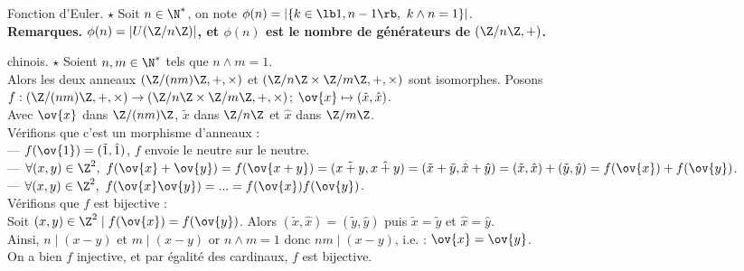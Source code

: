 \documentclass[11pt]{article}
\begin{document}
\begin{defi}{Fonction d'Euler. $\star$}{}
    Soit $n\in\N^*$, on note $\phi(n)=|\{k\in\lb1,n-1\rb, ~ k \land n = 1\}|$.\\
    \bf{Remarques.} $\phi(n)=|U(\Z/n\Z)|$, et $\phi(n)$ est le nombre de générateurs de $(\Z/n\Z,+)$.
\end{defi}

\begin{thm}{chinois. $\star$}{}
    Soient $n,m\in\N^*$ tels que $n\land m=1$.\\
    Alors les deux anneaux $(\Z/(nm)\Z,+,\times)$ et $(\Z/n\Z\times\Z/m\Z,+,\times)$ sont isomorphes.
    \tcblower
    Posons $f:(\Z/(nm)\Z,+,\times)\to(\Z/n\Z\times\Z/m\Z,+,\times)$; $\ov{x}\mapsto(\tilde{x},\hat{x})$.\\
    Avec $\ov{x}$ dans $\Z/(nm)\Z$, $\tilde{x}$ dans $\Z/n\Z$ et $\hat{x}$ dans $\Z/m\Z$.\\
    Vérifions que c'est un morphisme d'anneaux :\\
    --- $f(\ov{1})=(\tilde{1},\hat{1})$, $f$ envoie le neutre sur le neutre.\\
    --- $\forall (x,y) \in \Z^2, ~ f(\ov{x}+\ov{y})=f(\ov{x+y})=(\tilde{x+y},\hat{x+y})=(\tilde{x}+\tilde{y},\hat{x}+\hat{y})=(\tilde{x},\hat{x})+(\tilde{y},\hat{y})=f(\ov{x})+f(\ov{y})$.\\
    --- $\forall (x,y) \in \Z^2, ~ f(\ov{x}\ov{y})=...=f(\ov{x})f(\ov{y})$.\\
    Vérifions que $f$ est bijective :\\
    Soit $(x,y)\in\Z^2 \mid f(\ov{x})=f(\ov{y})$. Alors $(\tilde{x},\hat{x})=(\tilde{y},\hat{y})$ puis $\tilde{x}=\tilde{y}$ et $\hat{x}=\hat{y}$.\\
    Ainsi, $n \mid (x-y)$ et $m \mid (x-y)$ or $n\land m = 1$ donc $nm \mid (x-y)$, i.e. : $\ov{x}=\ov{y}$.\\
    On a bien $f$ injective, et par égalité des cardinaux, $f$ est bijective.
\end{thm}
\end{document}

